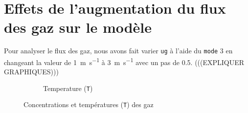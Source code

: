 \documentclass[11pt]{report}
\begin{document}
        \section{Effets de l'augmentation du flux des gaz sur le modèle}
            Pour analyser le flux des gaz, nous avons fait varier \verb|ug| à l'aide du \verb|mode| 3
            en changeant la valeur de \SI{1}{\meter\per\second} à \SI{3}{\meter\per\second} avec un pas de 0.5.
            (((EXPLIQUER GRAPHIQUES)))
            \begin{figure}[ht]
                \centering
                \begin{subfigure}[t]{0.325\textwidth}
                    \centering
                    
                    \caption{}
                    \label{graph:con:3:CH4}
                \end{subfigure}
                \hfill
                \begin{subfigure}[t]{0.325\textwidth}
                    \centering
                    
                    \caption{}
                    \label{graph:con:3:H2}
                \end{subfigure}
                \hfill
                \begin{subfigure}[t]{0.325\textwidth}
                    \centering
                    
                    \caption{}
                    \label{graph:con:3:CO}
                \end{subfigure}
                \hfill
                \begin{subfigure}[t]{0.325\textwidth}
                    \centering
                    
                    \caption{}
                    \label{graph:con:3:CO2}
                \end{subfigure}
                \begin{subfigure}[t]{0.325\textwidth}
                    \centering
                    
                    \caption{Temperature (\texttt{T})}
                    \label{graph:con:3:T}
                \end{subfigure}
                \caption{Concentrations et températures (\texttt{T}) des gaz}
                \label{graph:con:3}
            \end{figure}
        
\end{document}
